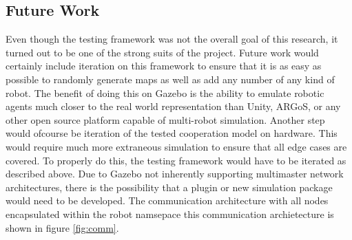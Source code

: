 \subsection{Future Work}
Even though the testing framework was not the overall goal of this research,
it turned out to be one of the strong suits of the project. Future work would certainly
include iteration on this framework to ensure that it is as easy as possible to
randomly generate maps as well as add any number of any kind of robot. The benefit
of doing this on Gazebo is the ability to emulate robotic agents much closer to the
real world representation than Unity, ARGoS, or any other open source platform
capable of multi-robot simulation. Another step would ofcourse be iteration of the tested cooperation model on hardware.
This would require much more extraneous simulation to ensure that all edge cases are
covered. To properly do this, the testing framework would have to be iterated as
described above. Due to Gazebo not inherently supporting multimaster network architectures,
there is the possibility that a plugin or new simulation package would need to be
developed.\cite{ROS-mm} The communication architecture with all nodes encapsulated within the robot namsepace
this communication archietecture is shown in figure \ref{fig:comm}.
